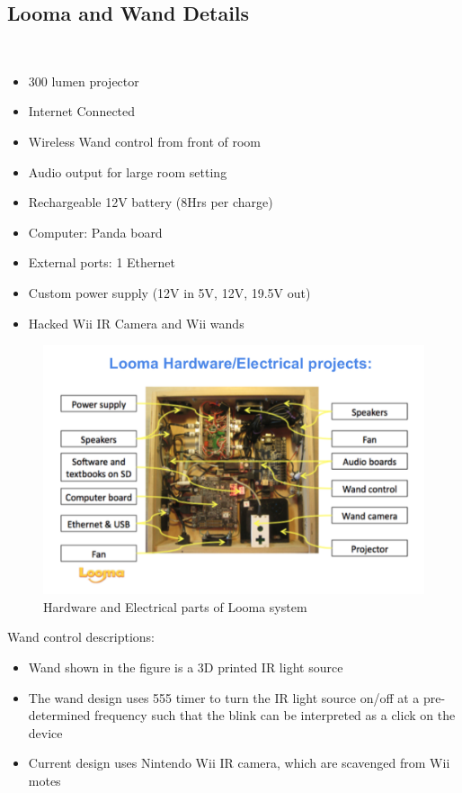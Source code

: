 \documentclass[12pt, a4paper]{article}
\begin{document}
\subsection{Looma and Wand Details}
~\\
\begin{itemize}
\item300 lumen projector
\item Internet Connected 
\item Wireless Wand control from front of room
\item Audio output for large room setting
\item Rechargeable 12V battery (8Hrs per charge)
\item Computer: Panda board
\item External ports: 1 Ethernet
\item Custom power supply (12V in 5V, 12V, 19.5V out)
\item Hacked Wii IR Camera and Wii wands
\end{itemize}

\begin{figure}[htp]
\centering
\includegraphics[scale=0.22]{looma}
\caption{Hardware and Electrical parts of Looma system}
\label{}
\end{figure}

\newpage

Wand control descriptions:
\begin{itemize}
\item Wand shown in the figure is a 3D printed IR light source
\item The wand design uses 555 timer to turn the IR light source on/off at a pre-determined frequency such that the blink can be interpreted as a click on the device
\item Current design uses Nintendo Wii IR camera, which are scavenged from Wii motes
\end{itemize}
\end{document}
